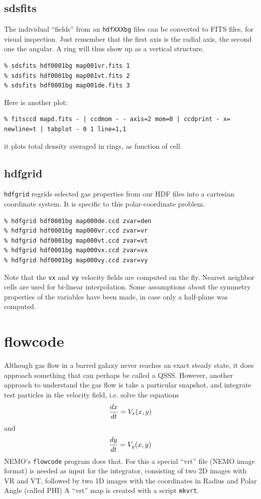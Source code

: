 \documentclass[10pt,dvips]{article}
\begin{document}
\subsection{sdsfits}

The individual ``fields'' from an {\tt hdfXXXbg} files can be converted to FITS files,
for visual inspection. Just remember that the first axis is the radial axis, the
second one the angular.  A ring will thus show up as a vertical structure.

\footnotesize\begin{verbatim}
% sdsfits hdf0001bg map001vr.fits 1
% sdsfits hdf0001bg map001vt.fits 2
% sdsfits hdf0001bg map001de.fits 3
\end{verbatim}\normalsize

Here is another plot:
\footnotesize\begin{verbatim}
% fitsccd mapd.fits - | ccdmom - - axis=2 mom=0 | ccdprint - x= newline=t | tabplot - 0 1 line=1,1
\end{verbatim}\normalsize
it plots total density averaged in rings, as function of cell.

\subsection{hdfgrid}

{\tt hdfgrid}
regrids selected gas properties from our 
HDF files into a cartesian coordinate system. 
It is specific to this polar-coordinate problem.

\footnotesize\begin{verbatim}
% hdfgrid hdf0001bg map000de.ccd zvar=den
% hdfgrid hdf0001bg map000vr.ccd zvar=vr
% hdfgrid hdf0001bg map000vt.ccd zvar=vt
% hdfgrid hdf0001bg map000vx.ccd zvar=vx
% hdfgrid hdf0001bg map000vy.ccd zvar=vy
\end{verbatim}\normalsize

Note that the {\tt vx} and {\tt vy} velocity fields
are computed on the fly. Nearest neighbor cells are
used for bi-linear interpolation. Some assumptions
about the symmetry properties of the variables
have been made, in case only a half-plane was
computed.



\section{flowcode}

Although gas flow in a barred galaxy never reaches an
exact steady state, it does approach something
that can perhaps be called a QSSS. However, another approach
to understand the gas flow is take a particular snapshot, and
integrate test particles in the velocity field, i.e.
solve the equations
$$
	{dx \over dt } = V_x(x,y)
$$
and
$$
	{dy \over dt } = V_y(x,y)
$$
NEMO's {\tt flowcode} program does that. For this a special
``vrt'' file (NEMO image format) is needed as input for the
integrator, consisting
of two 2D images with VR and VT, followed by two 1D images
with the coordinates in Radius and Polar Angle (called PHI)
A ``vrt'' map is created with a script {\tt mkvrt}.
\end{document}
